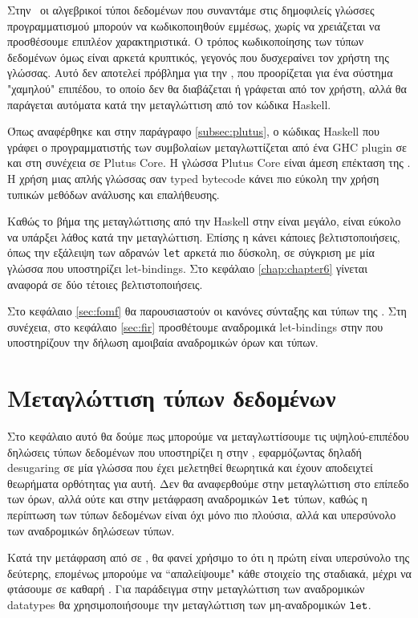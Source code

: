 \documentclass[diploma]{softlab-thesis}
\begin{document}
Στην \FOMF ~οι αλγεβρικοί τύποι δεδομένων που συναντάμε στις δημοφιλείς γλώσσες προγραμματισμού
μπορούν να κωδικοποιηθούν εμμέσως, χωρίς να χρειάζεται να προσθέσουμε επιπλέον χαρακτηριστικά.
Ο τρόπος κωδικοποίησης των τύπων δεδομένων όμως είναι αρκετά κρυπτικός, γεγονός που δυσχεραίνει
τον χρήστη της γλώσσας. Αυτό δεν αποτελεί πρόβλημα για την \FOMF , που προορίζεται για ένα σύστημα
"χαμηλού" επιπέδου, το οποίο δεν θα διαβάζεται ή γράφεται από τον χρήστη, αλλά θα παράγεται αυτόματα
κατά την μεταγλώττιση από τον κώδικα Haskell.

Όπως αναφέρθηκε και στην παράγραφο \ref{subsec:plutus}, ο κώδικας Haskell που γράφει ο
προγραμματιστής των συμβολαίων μεταγλωττίζεται από ένα GHC plugin σε \FIR{} και στη συνέχεια
σε Plutus Core. Η γλώσσα Plutus Core είναι άμεση επέκταση της \FOMF. Η χρήση μιας απλής γλώσσας
σαν typed bytecode κάνει πιο εύκολη την χρήση τυπικών μεθόδων ανάλυσης και επαλήθευσης.

Καθώς το βήμα της μεταγλώττισης από την Haskell στην \FOMF{} είναι μεγάλο, είναι εύκολο να υπάρξει
λάθος κατά την μεταγλώττιση. Επίσης η \FOMF{} κάνει κάποιες βελτιστοποιήσεις, όπως την
εξάλειψη των αδρανών \texttt{let} αρκετά πιο δύσκολη, σε σύγκριση με μία γλώσσα που υποστηρίζει
let-bindings. Στο κεφάλαιο \ref{chap:chapter6} γίνεται αναφορά σε δύο τέτοιες βελτιστοποιήσεις.

Στο κεφάλαιο \ref{sec:fomf} θα παρουσιαστούν οι κανόνες σύνταξης και τύπων της \FOMF. Στη συνέχεια,
στο κεφάλαιο  \ref{sec:fir}  προσθέτουμε αναδρομικά let-bindings στην \FOMF που υποστηρίζουν την
δήλωση αμοιβαία αναδρομικών όρων και τύπων.






\chapter{Μεταγλώττιση τύπων δεδομένων}
\label{chap:chapter5}
%
Στο κεφάλαιο αυτό θα δούμε πως μπορούμε να μεταγλωττίσουμε τις υψηλού-επιπέδου
δηλώσεις τύπων δεδομένων που υποστηρίζει η \FIR{} στην \FOMF, εφαρμόζωντας δηλαδή
desugaring σε μία γλώσσα που έχει μελετηθεί θεωρητικά και έχουν αποδειχτεί θεωρήματα
ορθότητας για αυτή. Δεν θα αναφερθούμε στην μεταγλώττιση στο επίπεδο των όρων, αλλά
ούτε και στην μετάφραση αναδρομικών $\operatorname{\texttt{let}}$ τύπων, καθώς η περίπτωση των τύπων δεδομένων
είναι όχι μόνο πιο πλούσια, αλλά και υπερσύνολο των αναδρομικών δηλώσεων τύπων.

Κατά την μετάφραση από \FIR{} σε \FOMF{}, θα φανεί χρήσιμο το ότι η πρώτη είναι υπερσύνολο
της δεύτερης, επομένως μπορούμε να ``απαλείψουμε" κάθε στοιχείο της \FIR{} σταδιακά, μέχρι
να φτάσουμε σε καθαρή \FOMF{}. Για παράδειγμα στην μεταγλώττιση των αναδρομικών datatypes
θα χρησιμοποιήσουμε την μεταγλώττιση των μη-αναδρομικών $\operatorname{\texttt{let}}$.
\end{document}
